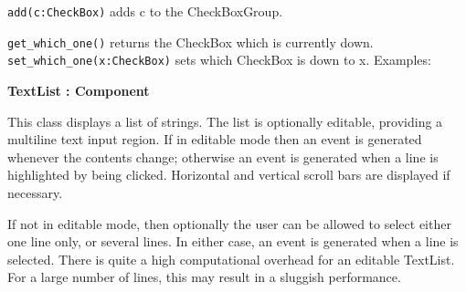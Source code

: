 \texttt{add(c:CheckBox)} adds c to the CheckBoxGroup.

\texttt{get\_which\_one()} returns the CheckBox which is currently down.\\
\texttt{set\_which\_one(x:CheckBox)} sets which CheckBox is down to x. Examples:


{\ttfamily\bfseries
{}TextList : Component}

This class displays a list of strings. The list is optionally editable,
providing a multiline text input region. If in editable mode then an
event is generated whenever the contents change; otherwise an event is
generated when a line is highlighted by being clicked. Horizontal and
vertical scroll bars are displayed if necessary.

If not in editable mode, then optionally the user can be allowed to
select either one line only, or several lines. In either case, an
event is generated when a line is selected. There is quite a high
computational overhead for an editable TextList. For a large number of
lines, this may result in a sluggish performance.

